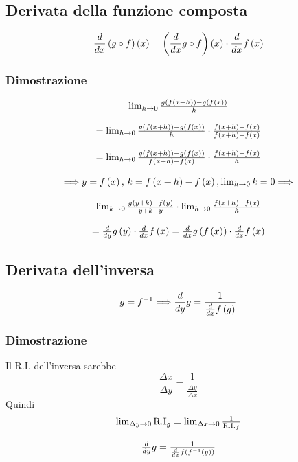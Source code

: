 \documentclass{report}
\begin{document}
    \subsection{Derivata della funzione composta}
        $$\D{x}\left(g \circ f\right)\left(x\right) =  \left(\D{x}g \circ f\right)\left(x\right) \cdot \D{x}f\left(x\right)$$
        \subsubsection{Dimostrazione}
            $$\begin{array}{c}
                \lim_{h \to 0}\frac{g\left(f\left(x + h\right)\right) - g\left(f\left(x\right)\right)}{h} \\ \\
                = \lim_{h \to 0}\frac{g\left(f\left(x + h\right)\right) - g\left(f\left(x\right)\right)}{h} \cdot \frac{f\left(x + h\right) - f\left(x\right)}{f\left(x + h\right) - f\left(x\right)} \\ \\
                = \lim_{h \to 0}\frac{g\left(f\left(x + h\right)\right) - g\left(f\left(x\right)\right)}{f\left(x + h\right) - f\left(x\right)} \cdot \frac{f\left(x + h\right) - f\left(x\right)}{h} \\ \\
                \Longrightarrow y = f\left(x\right), \, k = f\left(x + h\right) - f\left(x\right), \lim_{h \to 0}k = 0 \Longrightarrow \\ \\
                \lim_{k \to 0}\frac{g\left(y + k\right) - f\left(y\right)}{y + k - y} \cdot \lim_{h \to 0}\frac{f\left(x + h\right) - f\left(x\right)}{h} \\ \\
                = \D{y}g\left(y\right) \cdot \D{x}f\left(x\right) = \D{x}g\left(f\left(x\right)\right) \cdot \D{x}f \left(x\right)
            \end{array}$$
    \subsection{Derivata dell'inversa}
        $$g = f^{-1} \Longrightarrow \D{y}g = \frac{1}{\D{x}f\left(g\right)}$$
        \subsubsection{Dimostrazione}
            Il R.I. dell'inversa sarebbe $$\frac{\Delta x}{\Delta y} = \frac{1}{\frac{\Delta y}{\Delta x}}$$
            Quindi 
            $$\begin{matrix}
                \lim_{\Delta y \to 0}\textrm{R.I}_g = \lim_{\Delta x \to 0}\frac{1}{\textrm{R.I.}_f} \\ \\
                \D{y}g = \frac{1}{\D{x}f\left(f^{-1}\left(y\right)\right)}
            \end{matrix}$$
\end{document}
